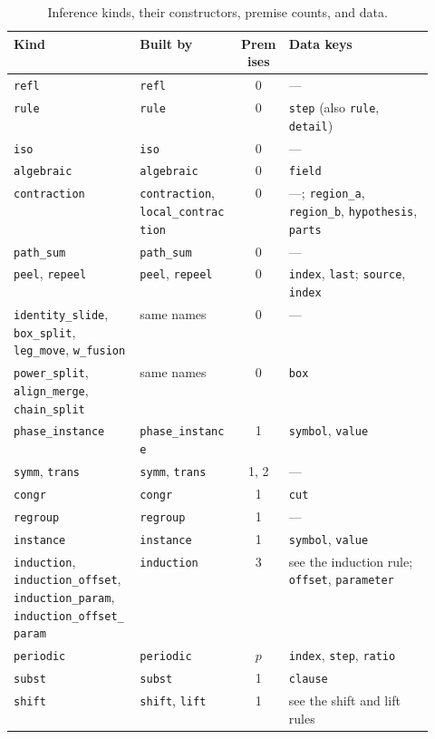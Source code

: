 \begin{table}[H]
\centering\small
\begin{tabularx}{\linewidth}{@{}>{\raggedright\arraybackslash}p{0.3\linewidth}>{\raggedright\arraybackslash}p{0.24\linewidth}c>{\raggedright\arraybackslash}X@{}}
\toprule
Kind & Built by & Premises & Data keys \\
\midrule
\texttt{refl} & \texttt{refl} & 0 & --- \\
\texttt{rule} & \texttt{rule} & 0 & \texttt{step} (also \texttt{rule}, \texttt{detail}) \\
\texttt{iso} & \texttt{iso} & 0 & --- \\
\texttt{algebraic} & \texttt{algebraic} & 0 & \texttt{field} \\
\texttt{contraction} & \texttt{contraction}, \texttt{local\_contraction} & 0 & ---; \texttt{region\_a}, \texttt{region\_b}, \texttt{hypothesis}, \texttt{parts} \\
\texttt{path\_sum} & \texttt{path\_sum} & 0 & --- \\
\texttt{peel}, \texttt{repeel} & \texttt{peel}, \texttt{repeel} & 0 & \texttt{index}, \texttt{last}; \texttt{source}, \texttt{index} \\
\texttt{identity\_slide}, \texttt{box\_split}, \texttt{leg\_move}, \texttt{w\_fusion} & same names & 0 & --- \\
\texttt{power\_split}, \texttt{align\_merge}, \texttt{chain\_split} & same names & 0 & \texttt{box} \\
\texttt{phase\_instance} & \texttt{phase\_instance} & 1 & \texttt{symbol}, \texttt{value} \\
\texttt{symm}, \texttt{trans} & \texttt{symm}, \texttt{trans} & 1, 2 & --- \\
\texttt{congr} & \texttt{congr} & 1 & \texttt{cut} \\
\texttt{regroup} & \texttt{regroup} & 1 & --- \\
\texttt{instance} & \texttt{instance} & 1 & \texttt{symbol}, \texttt{value} \\
\texttt{induction}, \texttt{induction\_offset}, \texttt{induction\_param}, \texttt{induction\_offset\_param} & \texttt{induction} & 3 & see the induction rule; \texttt{offset}, \texttt{parameter} \\
\texttt{periodic} & \texttt{periodic} & $p$ & \texttt{index}, \texttt{step}, \texttt{ratio} \\
\texttt{subst} & \texttt{subst} & 1 & \texttt{clause} \\
\texttt{shift} & \texttt{shift}, \texttt{lift} & 1 & see the shift and lift rules \\
\bottomrule
\end{tabularx}
\caption{Inference kinds, their constructors, premise counts, and data.}\label{tab:kernel-inferences}
\end{table}

